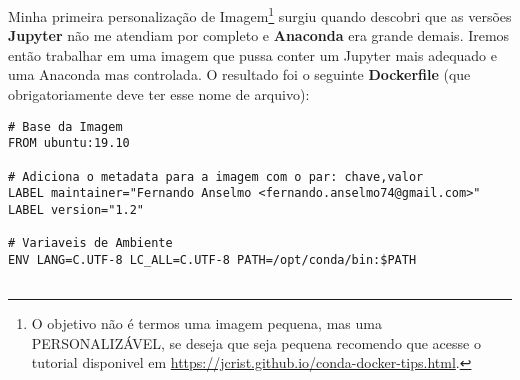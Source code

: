 Minha primeira personalização de Imagem\footnote{O objetivo não é termos uma imagem pequena, mas uma PERSONALIZÁVEL, se deseja que seja pequena recomendo que acesse o tutorial disponivel em \url{https://jcrist.github.io/conda-docker-tips.html}.} surgiu quando descobri que as versões \textbf{Jupyter} não me atendiam por completo e \textbf{Anaconda} era grande demais. Iremos então trabalhar em uma imagem que pussa conter um Jupyter mais adequado e uma Anaconda mas controlada. O resultado foi o seguinte \textbf{Dockerfile} (que obrigatoriamente deve ter esse nome de arquivo):
\begin{lstlisting}
# Base da Imagem
FROM ubuntu:19.10

# Adiciona o metadata para a imagem com o par: chave,valor
LABEL maintainer="Fernando Anselmo <fernando.anselmo74@gmail.com>"
LABEL version="1.2"

# Variaveis de Ambiente
ENV LANG=C.UTF-8 LC_ALL=C.UTF-8 PATH=/opt/conda/bin:$PATH


\end{lstlisting}
